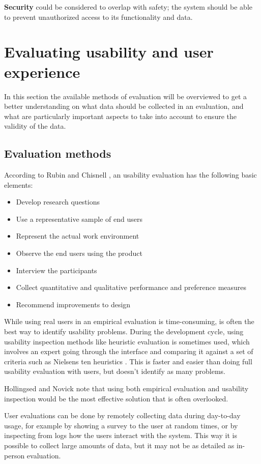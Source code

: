 \textbf{Security} could be considered to overlap with safety; the system should be able to prevent unauthorized access to its functionality and data. \cite{abran2003usability}

\section{Evaluating usability and user experience}
In this section the available methods of evaluation will be overviewed to get a better understanding on what data should be collected in an evaluation, and what are particularly important aspects to take into account to ensure the validity of the data.

\subsection{Evaluation methods}
According to Rubin and Chisnell \cite{rubin2008handbook}, an usability evaluation has the following basic elements:
\begin{itemize}
\item Develop research questions
\item Use a representative sample of end users
\item Represent the actual work environment
\item Observe the end users using the product
\item Interview the participants
\item Collect quantitative and qualitative performance and preference measures
\item Recommend improvements to design
\end{itemize}

While using real users in an empirical evaluation is time-consuming, is often the best way to identify usability problems. During the development cycle, using usability inspection methods like heuristic evaluation is sometimes used, which involves an expert going through the interface and comparing it against a set of criteria such as Nielsens ten heuristics \cite{Solr-oula.410573, nielsen1995usability}. This is faster and easier than doing full usability evaluation with users, but doesn't identify as many problems.

Hollingsed and Novick \cite{hollingsed2007usability} note that using both empirical evaluation and usability inspection would be the most effective solution that is often overlooked.

User evaluations can be done by remotely collecting data during day-to-day usage, for example by showing a survey to the user at random times, or by inspecting from logs how the users interact with the system. \cite{bevanevaluation} This way it is possible to collect large amounts of data, but it may not be as detailed as in-person evaluation.

